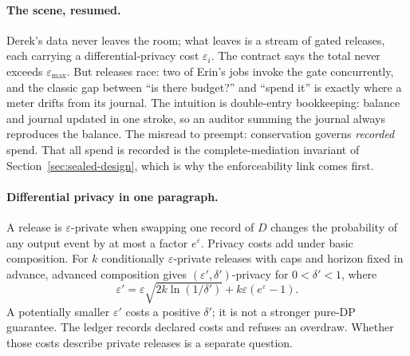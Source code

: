 \documentclass[11pt,a4paper]{article}
\theoremstyle{definition}
\begin{document}
\paragraph{The scene, resumed.} %
Derek's data never leaves the room; what leaves is a stream of gated releases,
each carrying a differential-privacy cost $\varepsilon_i$. The contract says the
total never exceeds $\varepsilon_{\max}$. But releases race: two of Erin's jobs
invoke the gate concurrently, and the classic gap between ``is there budget?''
and ``spend it'' is exactly where a meter drifts from its journal. The
intuition is double-entry bookkeeping: balance and journal updated in one
stroke, so an auditor summing the journal always reproduces the balance. The
misread to preempt: conservation governs \emph{recorded} spend. That all spend
is recorded is the complete-mediation invariant of
Section~\ref{sec:sealed-design}, which is why the enforceability link comes
first.

\paragraph{Differential privacy in one paragraph.}
A release is $\varepsilon$-private when swapping one record of $D$ changes
the probability of any output event by at most a factor $e^{\varepsilon}$.
Privacy costs add under basic composition. For $k$ conditionally
$\varepsilon$-private releases with caps and horizon fixed in advance,
advanced composition gives $(\varepsilon',\delta')$-privacy for $0<\delta'<1$, where
\[
\varepsilon'=\varepsilon\sqrt{2k\ln(1/\delta')}+k\varepsilon(e^{\varepsilon}-1).
\]
A potentially smaller $\varepsilon'$ costs a positive $\delta'$; it is not a
stronger pure-DP guarantee. The ledger records declared costs and refuses an
overdraw. Whether those costs describe private releases is a separate question.
\end{document}
